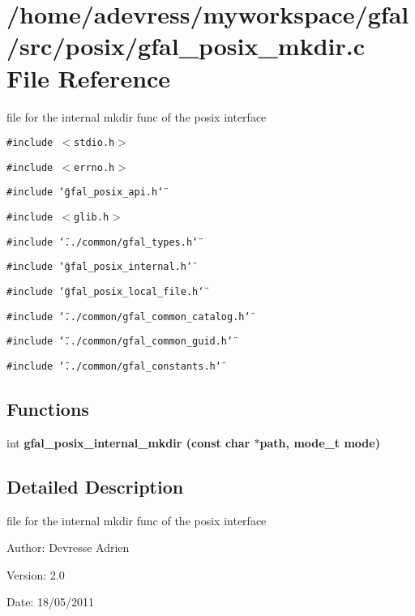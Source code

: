 \section{/home/adevress/myworkspace/gfal/src/posix/gfal\_\-posix\_\-mkdir.c File Reference}
\label{gfal__posix__mkdir_8c}
file for the internal mkdir func of the posix interface 

{\tt \#include $<$stdio.h$>$}\par
{\tt \#include $<$errno.h$>$}\par
{\tt \#include \char`\"{}gfal\_\-posix\_\-api.h\char`\"{}}\par
{\tt \#include $<$glib.h$>$}\par
{\tt \#include \char`\"{}../common/gfal\_\-types.h\char`\"{}}\par
{\tt \#include \char`\"{}gfal\_\-posix\_\-internal.h\char`\"{}}\par
{\tt \#include \char`\"{}gfal\_\-posix\_\-local\_\-file.h\char`\"{}}\par
{\tt \#include \char`\"{}../common/gfal\_\-common\_\-catalog.h\char`\"{}}\par
{\tt \#include \char`\"{}../common/gfal\_\-common\_\-guid.h\char`\"{}}\par
{\tt \#include \char`\"{}../common/gfal\_\-constants.h\char`\"{}}\par
\subsection*{Functions}
\begin{CompactItemize}
\item 
int \bf{gfal\_\-posix\_\-internal\_\-mkdir} (const char $\ast$path, mode\_\-t mode)
\end{CompactItemize}


\subsection{Detailed Description}
file for the internal mkdir func of the posix interface 

\begin{Desc}
\item[Author:]Devresse Adrien \end{Desc}
\begin{Desc}
\item[Version:]2.0 \end{Desc}
\begin{Desc}
\item[Date:]18/05/2011 \end{Desc}


